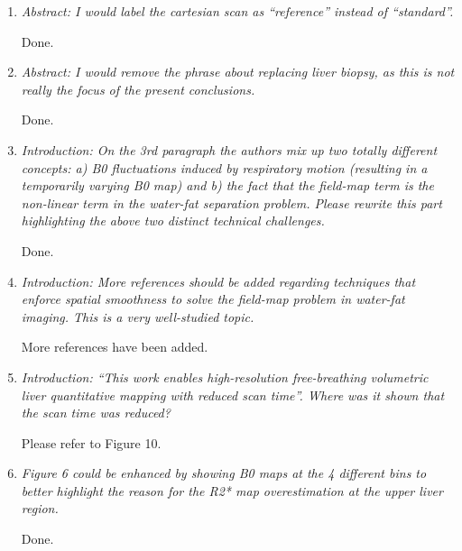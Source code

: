 \documentclass[a4paper,11pt]{report}
\begin{document}
\begin{enumerate}[resume]

	\item \textit{Abstract: I would label the cartesian scan as “reference” instead of “standard”.}

\hspace{1em} Done.

	\item \textit{Abstract: I would remove the phrase about replacing liver biopsy, as this is not really the focus of the present conclusions.}

\hspace{1em} Done.

	\item \textit{Introduction: On the 3rd paragraph the authors mix up two totally different concepts: a) B0 fluctuations induced by respiratory motion (resulting in a temporarily varying B0 map) and b) the fact that the field-map term is the non-linear term in the water-fat separation problem. Please rewrite this part highlighting the above two distinct technical challenges.}
	
\hspace{1em} Done.

	\item \textit{Introduction: More references should be added regarding techniques that enforce spatial smoothness to solve the field-map problem in water-fat imaging. This is a very well-studied topic.}

\hspace{1em} More references have been added.

	\item \textit{Introduction: “This work enables high-resolution free-breathing volumetric liver quantitative mapping with reduced scan time”. Where was it shown that the scan time was reduced?}

\hspace{1em} Please refer to Figure 10.

	\item \textit{Figure 6 could be enhanced by showing B0 maps at the 4 different bins to better highlight the reason for the R2* map overestimation at the upper liver region.}
	
\hspace{1em} Done.

\end{enumerate}

\vfill
\pagebreak

\end{document}
